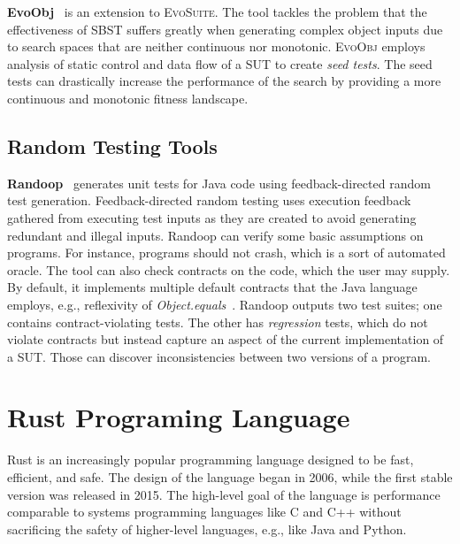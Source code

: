\documentclass[paper=a4,%
  twoside,%
  BCOR4mm,%
  abstract=true,%
  toc=bibliography,%
  chapterprefix=true,%
  toc=bibliographynumbered,%
  open=right,%
  english,%
  pagesize=pdftex]{scrreprt}
\begin{document}
\textbf{EvoObj}~\cite{Lin2021} is an extension to \textsc{EvoSuite}. The tool tackles the problem that the effectiveness of \ac{SBST} suffers greatly when generating complex object inputs due to search spaces that are neither continuous nor monotonic. \textsc{EvoObj} employs analysis of static control and data flow of a \ac{SUT} to create \emph{seed tests}. The seed tests can drastically increase the performance of the search by providing a more continuous and monotonic fitness landscape.

\section{Random Testing Tools}
\textbf{Randoop}~\cite{Pacheco_2007} generates unit tests for Java code using feedback-directed random test generation. Feedback-directed random testing uses execution feedback gathered from executing test inputs as they are created to avoid generating redundant and illegal inputs. Randoop can verify some basic assumptions on programs. For instance, programs should not crash, which is a sort of automated oracle. The tool can also check  contracts on the code, which the user may supply. By default, it implements multiple default contracts that the Java language employs, e.g., reflexivity of \emph{Object.equals}~\cite{Fraser2013}. Randoop outputs two test suites; one contains contract-violating tests. The other has \emph{regression} tests, which do not violate contracts but instead capture an aspect of the current implementation of a \ac{SUT}. Those can discover inconsistencies between two versions of a program.


\clearpage
\chapter{Rust Programing Language}
\label{chap:rust-programming-language}
Rust is an increasingly popular programming language designed to be fast, efficient, and safe. The design of the language began in 2006, while the first stable version was released in 2015. The high-level goal of the language is performance comparable to systems programming languages like C and C++ without sacrificing the safety of higher-level languages, e.g., like Java and Python.
\end{document}
